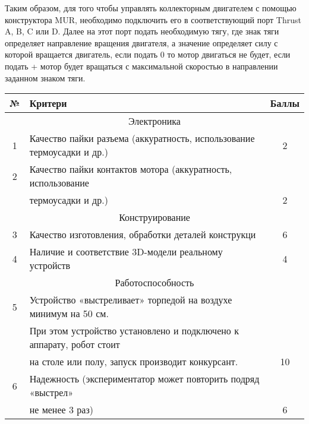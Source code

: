 Таким образом, для того чтобы управлять коллекторным двигателем с помощью конструктора MUR, необходимо подключить его в соответствующий порт Thrust A, B, C или D. Далее на этот порт подать необходимую тягу, где знак тяги определяет направление вращения двигателя, а значение определяет силу с которой вращается двигатель, если подать 0 то мотор двигаться не будет, если подать + мотор будет вращаться с максимальной скоростью в направлении заданном знаком тяги.

\markSection

\begin{table}[H]
    \center
    \small
    \begin{tabular}{|c|l|c|}
        \hline
        № & Критери & Баллы  \\
        \hline
        \multicolumn{3}{|c|}{Электроника} \\
        \hline
        1 & Качество пайки разъема (аккуратность, использование термоусадки и др.) & 2 \\
        \hline
        2 & Качество пайки контактов мотора (аккуратность, использование & \\
          & термоусадки и др.) & 2 \\
        \hline
        \multicolumn{3}{|c|}{Конструирование} \\
        \hline
        3 & Качество изготовления, обработки деталей конструкци & 6 \\
        \hline
        4 & Наличие и соответствие 3D-модели реальному устройств & 4 \\
        \hline
        \multicolumn{3}{|c|}{Работоспособность} \\
        \hline
        5 & Устройство «выстреливает» торпедой на воздухе минимум на 50 см. & \\
          & При этом устройство установлено и подключено к аппарату, робот стоит & \\
          & на столе или полу, запуск производит конкурсант.  & 10 \\
        \hline
        6 & Надежность (экспериментатор может повторить подряд «выстрел»& \\
          & не менее 3 раз) & 6 \\
        \hline
    \end{tabular}
\end{table}


